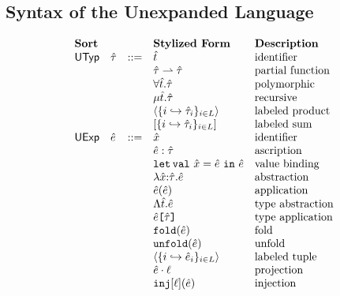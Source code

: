 \subsection{Syntax of the Unexpanded Language}\label{sec:syntax-U}
\begin{figure}[t!]
\[\begin{array}{lllllll}
\textbf{Sort} & &  
& \textbf{Stylized Form} & \textbf{Description}\\
\mathsf{UTyp} & \utau & ::= 
& \ut & \text{identifier}\\
&& 
& \parr{\utau}{\utau} & \text{partial function}\\
&&
& \forallt{\ut}{\utau} & \text{polymorphic}\\
&&
& \rect{\ut}{\utau} & \text{recursive}\\
&&
& \prodt{\mapschema{\utau}{i}{\labelset}} & \text{labeled product}\\
&&
& \sumt{\mapschema{\utau}{i}{\labelset}} & \text{labeled sum}\\
\mathsf{UExp} & \ue & ::= 
& \ux & \text{identifier}\\
&&
%
& \asc{\ue}{\utau} & \text{ascription}\\
&&
%
& \letsyn{\ux}{\ue}{\ue} & \text{value binding}\\
&&
& \lam{\ux}{\utau}{\ue} & \text{abstraction}\\
&&
& \ap{\ue}{\ue} & \text{application}\\
&&
& \Lam{\ut}{\ue} & \text{type abstraction}\\
&&
& \App{\ue}{\utau} & \text{type application}\\
&&
& \fold{\ue} & \text{fold}\\
&&
& \unfold{\ue} & \text{unfold}\\
&&
& \tpl{\mapschema{\ue}{i}{\labelset}} & \text{labeled tuple}\\
&&
& \prj{\ue}{\ell} & \text{projection}\\
&&
& \inj{\ell}{\ue} & \text{injection}\\
&&

\end{array}\]
\end{figure}
